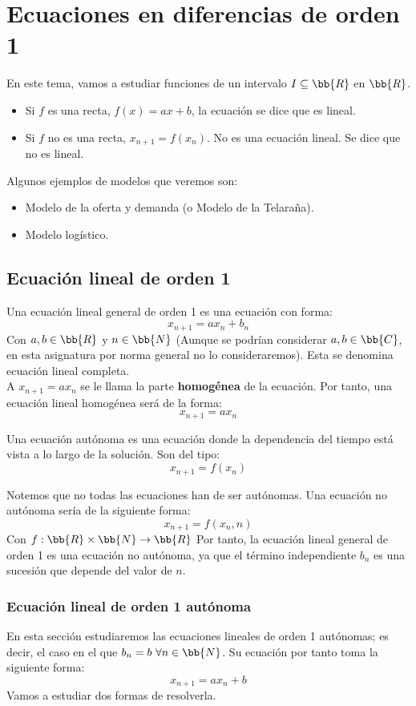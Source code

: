 \chapter{Ecuaciones en diferencias de orden 1}
En este tema, vamos a estudiar funciones de un intervalo $I \subseteq \bb{R}$ en $\bb{R}$.
\begin{itemize}
    \item Si $f$ es una recta, $f(x) = ax+b$, la ecuación se dice que es lineal.
    \item Si $f$ no es una recta, $x_{n+1} = f(x_n)$. No es una ecuación lineal. Se dice que no es lineal.
\end{itemize}

Algunos ejemplos de modelos que veremos son:
\begin{itemize}
    \item Modelo de la oferta y demanda (o Modelo de la Telaraña).
    \item Modelo logístico.
\end{itemize}

\section{Ecuación lineal de orden 1}
Una ecuación lineal general de orden 1 es una ecuación con forma:
$$x_{n+1} = ax_n + b_n$$
Con $a, b \in \bb{R}$ y $n \in \bb{N}$ (Aunque se podrían considerar $a, b \in \bb{C}$, en esta asignatura por norma general no lo consideraremos). Esta se denomina ecuación lineal completa.\\

A $x_{n+1} = ax_n$ se le llama la parte \textbf{homogénea} de la ecuación. Por tanto, una ecuación lineal homogénea será de la forma:
$$x_{n+1} = ax_n$$

\begin{definicion}
    Una ecuación autónoma es una ecuación donde la dependencia del tiempo está vista a lo largo de la solución. Son del tipo:
    $$x_{n+1} = f(x_n)$$
\end{definicion}

Notemos que no todas las ecuaciones han de ser autónomas. Una ecuación no autónoma sería de la siguiente forma:
    $$x_{n+1} = f(x_n, n)$$
Con $f:\bb{R}\times\bb{N}\to \bb{R}$ Por tanto, la ecuación lineal general de orden 1 es una ecuación no autónoma, ya que el término independiente $b_n$ es una sucesión que depende del valor de $n$.

\subsection{Ecuación lineal de orden 1 autónoma}
En esta sección estudiaremos las ecuaciones lineales de orden 1 autónomas; es decir, el caso en el que $b_n = b~\forall n \in \bb{N}$. Su ecuación por tanto toma la siguiente forma:
$$x_{n+1} = ax_n + b$$
Vamos a estudiar dos formas de resolverla.

